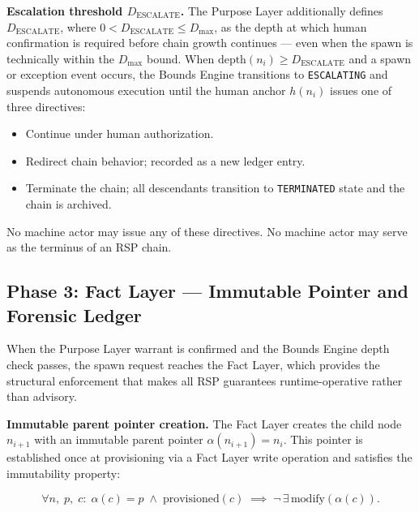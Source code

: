 \medskip
\noindent\textbf{Escalation threshold $D_{\text{ESCALATE}}$.} The Purpose Layer additionally defines $D_{\text{ESCALATE}}$, where $0 < D_{\text{ESCALATE}} \leq D_{\max}$, as the depth at which human confirmation is required before chain growth continues — even when the spawn is technically within the $D_{\max}$ bound. When $\text{depth}(n_i) \geq D_{\text{ESCALATE}}$ and a spawn or exception event occurs, the Bounds Engine transitions to \texttt{ESCALATING} and suspends autonomous execution until the human anchor $h(n_i)$ issues one of three directives:

\begin{itemize}
    \item[\texttt{ACK}] Continue under human authorization.
    \item[\texttt{RESOLVE}] Redirect chain behavior; recorded as a new ledger entry.
    \item[\texttt{REJECT}] Terminate the chain; all descendants transition to \texttt{TERMINATED} state and the chain is archived.
\end{itemize}

No machine actor may issue any of these directives. No machine actor may serve as the terminus of an RSP chain.

\subsection{Phase 3: Fact Layer — Immutable Pointer and Forensic Ledger}
\label{sec:rs-phase3}

When the Purpose Layer warrant is confirmed and the Bounds Engine depth check passes, the spawn request reaches the Fact Layer, which provides the structural enforcement that makes all RSP guarantees runtime-operative rather than advisory.

\medskip
\noindent\textbf{Immutable parent pointer creation.} The Fact Layer creates the child node $n_{i+1}$ with an immutable parent pointer $\alpha(n_{i+1}) = n_i$. This pointer is established once at provisioning via a Fact Layer write operation and satisfies the immutability property:

\begin{equation}
\forall n,\; p,\; c:\;
\alpha(c) = p \;\land\; \text{provisioned}(c)
\;\implies\;
\neg\,\exists\,\text{modify}(\alpha(c)).
\label{eq:parent-pointer-immutability}
\end{equation}

